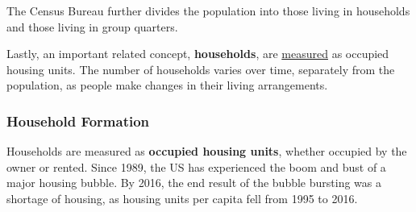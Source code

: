 \documentclass{report}
\begin{document}
{\begin{minipage}{0.76\textwidth}
The Census Bureau further divides the population into those living in households and those living in group quarters.  

Lastly, an important related concept, \textbf{households}, are \href{https://www.census.gov/housing/hvs/index.html}{measured} as occupied housing units. The number of households varies over time, separately from the population, as people make changes in their living arrangements.  
\end{minipage}
\newpage
\begin{minipage}{0.76\textwidth}
\subsubsection*{Household Formation}
\small Households are measured as \textbf{occupied housing units}, whether occupied by the owner or rented. Since 1989, the US has experienced the boom and bust of a major housing bubble. By 2016, the end result of the bubble bursting was a shortage of housing, as housing units per capita fell from 1995 to 2016. 
\vspace{1mm}
 

\end{minipage}}
\end{document}
